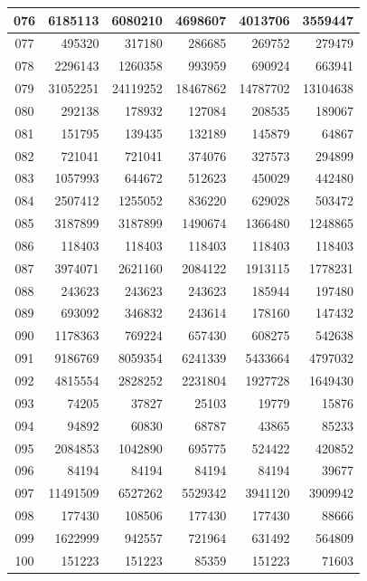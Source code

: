 \begin{longtable}{|c|r|r|r|r|r|}
\hline
076 & 6185113 & 6080210 & 4698607 & 4013706 & 3559447 \\
\hline
077 & 495320 & 317180 & 286685 & 269752 & 279479 \\
\hline
078 & 2296143 & 1260358 & 993959 & 690924 & 663941 \\
\hline
079 & 31052251 & 24119252 & 18467862 & 14787702 & 13104638 \\
\hline
080 & 292138 & 178932 & 127084 & 208535 & 189067 \\
\hline
081 & 151795 & 139435 & 132189 & 145879 & 64867 \\
\hline
082 & 721041 & 721041 & 374076 & 327573 & 294899 \\
\hline
083 & 1057993 & 644672 & 512623 & 450029 & 442480 \\
\hline
084 & 2507412 & 1255052 & 836220 & 629028 & 503472 \\
\hline
085 & 3187899 & 3187899 & 1490674 & 1366480 & 1248865 \\
\hline
086 & 118403 & 118403 & 118403 & 118403 & 118403 \\
\hline
087 & 3974071 & 2621160 & 2084122 & 1913115 & 1778231 \\
\hline
088 & 243623 & 243623 & 243623 & 185944 & 197480 \\
\hline
089 & 693092 & 346832 & 243614 & 178160 & 147432 \\
\hline
090 & 1178363 & 769224 & 657430 & 608275 & 542638 \\
\hline
091 & 9186769 & 8059354 & 6241339 & 5433664 & 4797032 \\
\hline
092 & 4815554 & 2828252 & 2231804 & 1927728 & 1649430 \\
\hline
093 & 74205 & 37827 & 25103 & 19779 & 15876 \\
\hline
094 & 94892 & 60830 & 68787 & 43865 & 85233 \\
\hline
095 & 2084853 & 1042890 & 695775 & 524422 & 420852 \\
\hline
096 & 84194 & 84194 & 84194 & 84194 & 39677 \\
\hline
097 & 11491509 & 6527262 & 5529342 & 3941120 & 3909942 \\
\hline
098 & 177430 & 108506 & 177430 & 177430 & 88666 \\
\hline
099 & 1622999 & 942557 & 721964 & 631492 & 564809 \\
\hline
100 & 151223 & 151223 & 85359 & 151223 & 71603 \\
\hline
\end{longtable}
\normalsize
\renewcommand{\arraystretch}{1.2}


